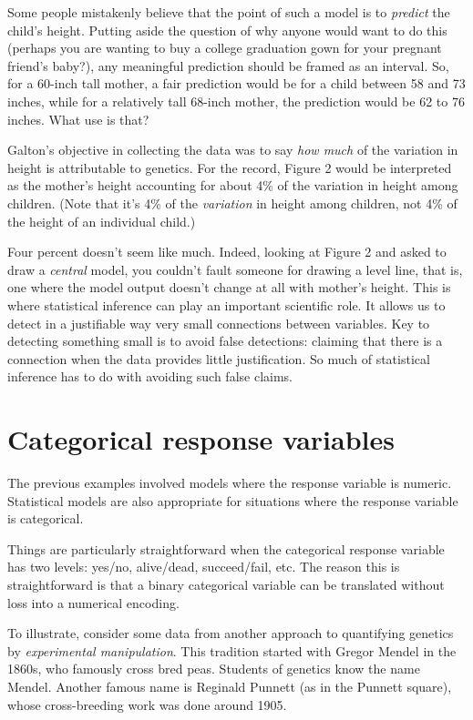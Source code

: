 \documentclass[]{tufte-book}
\begin{document}
Some people mistakenly believe that the point of such a model is to \emph{predict} the child's height. Putting aside the question of why anyone would want to do this (perhaps you are wanting to buy a college graduation gown for your pregnant friend's baby?), any meaningful prediction should be framed as an interval. So, for a 60-inch tall mother, a fair prediction would be for a child between 58 and 73 inches, while for a relatively tall 68-inch mother, the prediction would be 62 to 76 inches. What use is that?

Galton's objective in collecting the data was to say \emph{how much} of the variation in height is attributable to genetics. For the record, Figure 2 would be interpreted as the mother's height accounting for about 4\% of the variation in height among children. (Note that it's 4\% of the \emph{variation} in height among children, not 4\% of the height of an individual child.)

Four percent doesn't seem like much. Indeed, looking at Figure 2 and asked to draw a \emph{central} model, you couldn't fault someone for drawing a level line, that is, one where the model output doesn't change at all with mother's height. This is where statistical inference can play an important scientific role. It allows us to detect in a justifiable way very small connections between variables. Key to detecting something small is to avoid false detections: claiming that there is a connection when the data provides little justification. So much of statistical inference has to do with avoiding such false claims.

\hypertarget{categorical-response-variables}{%
\section{Categorical response variables}\label{categorical-response-variables}}

The previous examples involved models where the response variable is numeric. Statistical models are also appropriate for situations where the response variable is categorical.

Things are particularly straightforward when the categorical response variable has two levels: yes/no, alive/dead, succeed/fail, etc. The reason this is straightforward is that a binary categorical variable can be translated without loss into a numerical encoding.

To illustrate, consider some data from another approach to quantifying genetics by \emph{experimental manipulation}. This tradition started with Gregor Mendel in the 1860s, who famously cross bred peas. Students of genetics know the name Mendel. Another famous name is Reginald Punnett (as in the Punnett square), whose cross-breeding work was done around 1905.
\end{document}
